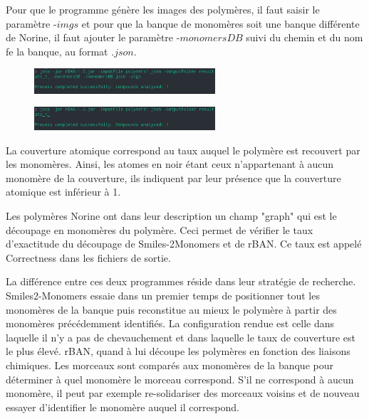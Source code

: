 \documentclass[11pt, a4paper]{report}
\begin{document}
	Pour que le programme génère les images des polymères, il faut saisir le paramètre -$imgs$ et pour que la banque de monomères soit une banque différente de Norine, il faut ajouter le paramètre -$monomersDB$ suivi du chemin et du nom fe la banque, au format $.json$.
	
	\begin{figure}[H]
		\captionsetup{justification=centering}
		\centering
		\includegraphics[width=0.6\textwidth]{images/java-jarrBAN-monoDB-imgs.png}
	\end{figure}
	\vspace{0.000000000001cm}
	\begin{figure}[H]
			\captionsetup{justification=centering}
			\centering
		\includegraphics[width=0.6\textwidth]{images/java-jarrBAN.png}
	\end{figure}
	
	
	
	La couverture atomique correspond au taux auquel le polymère est recouvert par les monomères. Ainsi, les atomes en noir étant ceux n'appartenant à aucun monomère de la couverture, ils indiquent par leur présence que la couverture atomique est inférieur à 1.
	
	Les polymères Norine ont dans leur description un champ "graph" qui est le découpage en monomères du polymère. Ceci permet de vérifier le taux d'exactitude du découpage de Smiles-2Monomers et de rBAN. Ce taux est appelé Correctness dans les fichiers de sortie.
	
	La différence entre ces deux programmes réside dans leur stratégie de recherche. Smiles2-Monomers essaie dans un premier temps de positionner tout les monomères de la banque puis reconstitue au mieux le polymère à partir des monomères précédemment identifiés. La configuration rendue est celle dans laquelle il n'y a pas de chevauchement et dans laquelle le taux de couverture est le plus élevé. rBAN, quand à lui découpe les polymères en fonction des liaisons chimiques. Les morceaux sont comparés aux monomères de la banque pour déterminer à quel monomère le morceau correspond. S'il ne correspond à aucun monomère, il peut par exemple re-solidariser des morceaux voisins et de nouveau essayer d'identifier le monomère auquel il correspond.
	
\end{document}
